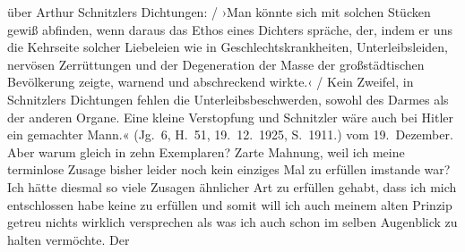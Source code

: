\begin{ledgroupsized}[t]{13cm}
{{{                        über Arthur Schnitzlers
                        Dichtungen:{ / }›Man könnte sich mit solchen Stücken gewiß abfinden, wenn daraus das Ethos
                        eines Dichters spräche, der, indem er uns die Kehrseite solcher Liebeleien
                        wie in Geschlechtskrankheiten, Unterleibsleiden, nervösen Zerrüttungen und
                        der Degeneration der Masse der großstädtischen Bevölkerung zeigte, warnend
                        und abschreckend wirkte.‹{ / }Kein Zweifel, in Schnitzlers
                        Dichtungen fehlen die Unterleibsbeschwerden, sowohl des Darmes als der
                        anderen Organe. Eine kleine Verstopfung und Schnitzler wäre auch bei Hitler ein gemachter Mann.« (Jg. 6, H. 51, 19. 12. 1925, S. 1911.)}}}\label{K_L02459-1h}
               vom 19. Dezember. Aber warum gleich in zehn Exemplaren? Zarte Mahnung,
               weil ich meine terminlose Zusage bisher leider noch kein einziges Mal zu erfüllen
               imstande war? Ich hätte diesmal so viele Zusagen ähnlicher Art zu erfüllen gehabt,
               dass ich mich entschlossen habe keine zu erfüllen und somit will ich auch meinem
               alten Prinzip getreu nichts wirklich versprechen als was ich auch schon im selben
               Augenblick zu halten vermöchte.\pend
           \pstart
           Der \label{K_L02459-2v}
\end{ledgroupsized}
